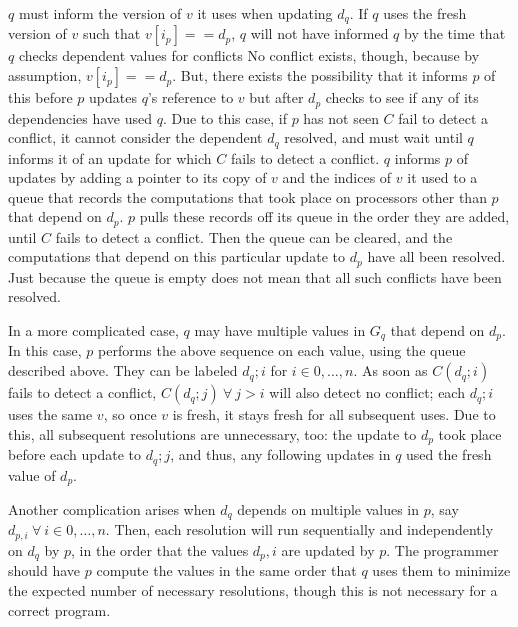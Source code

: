$q$ must inform the version of $v$ it uses when updating $d_q$. If $q$ uses the
fresh version of $v$ such that $v[i_p] == d_p$, $q$ will not have informed $q$
by the time that $q$ checks dependent values for conflicts No conflict exists,
though, because by assumption, $v[i_p] == d_p$. But, there exists the 
possibility that it informs $p$ of this before $p$ updates $q$'s reference to
$v$ but after $d_p$ checks to see if any of its dependencies have used $q$. Due
to this case, if $p$ has not seen $C$ fail to detect a conflict, it cannot
consider the dependent $d_q$ resolved, and must wait until $q$ informs it of an
update for which $C$ fails to detect a conflict. $q$ informs $p$ of updates by
adding a pointer to its copy of $v$ and the indices of $v$ it used to a queue
that records the computations that took place on processors other than $p$ that
depend on $d_p$. $p$ pulls these records off its queue in the order they are
added, until $C$ fails to detect a conflict. Then the queue can be cleared, and
the computations that depend on this particular update to $d_p$ have all been
resolved. Just because the queue is empty does not mean that all such conflicts
have been resolved.

In a more complicated case, $q$ may have multiple values in $G_q$ that depend on
$d_p$. In this case, $p$ performs the above sequence on each value, using the
queue described above. They can be labeled $d_q;i$ for $i \in 0, \dots, n$. As
soon as $C(d_q;i)$ fails to detect a conflict, $C(d_q;j) ~ \forall ~ j > i $
will also detect no conflict; each $d_q;i$ uses the same $v$, so once $v$ is
fresh, it stays fresh for all subsequent uses. Due to this, all subsequent
resolutions are unnecessary, too: the update to $d_p$ took place before each
update to $d_q;j$, and thus, any following updates in $q$ used the fresh value
of $d_p$.

Another complication arises when $d_q$ depends on multiple values in $p$, say
$d_{p,i} ~ \forall ~ i \in 0, \dots, n$. Then, each resolution will run
sequentially and independently on $d_q$ by $p$, in the order that the values
$d_p,i$ are updated by $p$. The programmer should have $p$ compute the values in
the same order that $q$ uses them to minimize the expected number of necessary
resolutions, though this is not necessary for a correct program.

